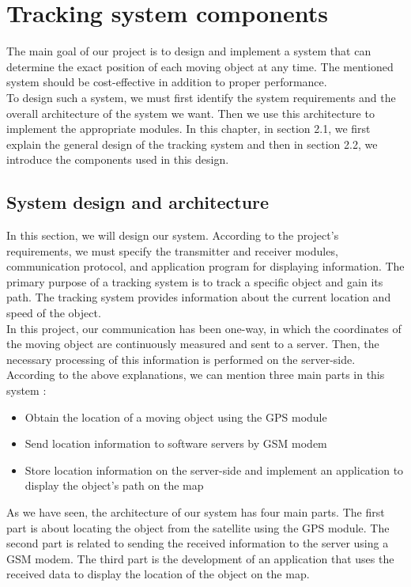 \chapter{Tracking system components}
The main goal of our project is to design and implement a system that can determine the exact position of each moving object at any time. The mentioned system should be cost-effective in addition to proper performance.\\
To design such a system, we must first identify the system requirements and the overall architecture of the system we want. Then we use this architecture to implement the appropriate modules. In this chapter, in section 2.1, we first explain the general design of the tracking system and then in section 2.2, we introduce the components used in this design.

\section{System design and architecture}
In this section, we will design our system. According to the project's requirements, we must specify the transmitter and receiver modules, communication protocol, and application program for displaying information. The primary purpose of a tracking system is to track a specific object and gain its path. The tracking system provides information about the current location and speed of the object.\\
In this project, our communication has been one-way, in which the coordinates of the moving object are continuously measured and sent to a server. Then, the necessary processing of this information is performed on the server-side. According to the above explanations, we can mention three main parts in this system \cite{5}:
\begin{itemize}
	\item Obtain the location of a moving object using the GPS module
	\item Send location information to software servers by GSM modem
	\item Store location information on the server-side and implement an application to display the object's path on the map
\end{itemize}
As we have seen, the architecture of our system has four main parts. The first part is about locating the object from the satellite using the GPS module. The second part is related to sending the received information to the server using a GSM modem. The third part is the development of an application that uses the received data to display the location of the object on the map.\\
